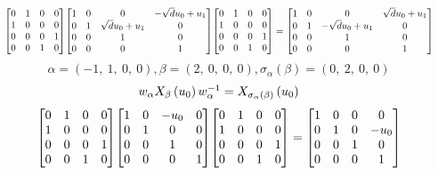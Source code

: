 \documentclass[11pt]{article}
\theoremstyle{definition}
\begin{document}
\[
\scaletoalign{\textwidth}{{\left[\begin{matrix}0 & 1 & 0 & 0\\1 & 0 & 0 & 0\\0 & 0 & 0 & 1\\0 & 0 & 1 & 0\end{matrix}\right]} {\left[\begin{matrix}1 & 0 & 0 & - \sqrt{d} u_{0} + u_{1}\\0 & 1 & \sqrt{d} u_{0} + u_{1} & 0\\0 & 0 & 1 & 0\\0 & 0 & 0 & 1\end{matrix}\right]} {\left[\begin{matrix}0 & 1 & 0 & 0\\1 & 0 & 0 & 0\\0 & 0 & 0 & 1\\0 & 0 & 1 & 0\end{matrix}\right]} = {\left[\begin{matrix}1 & 0 & 0 & \sqrt{d} u_{0} + u_{1}\\0 & 1 & - \sqrt{d} u_{0} + u_{1} & 0\\0 & 0 & 1 & 0\\0 & 0 & 0 & 1\end{matrix}\right]}}
\]
\[
\alpha = \left( -1, \  1, \  0, \  0\right), \beta = \left( 2, \  0, \  0, \  0\right), \sigma_{\alpha}(\beta) = \left( 0, \  2, \  0, \  0\right)
\]
\[
\scaletoalign{\textwidth}{w_{\alpha} X_{\beta}\left(u_{0}\right) w_{\alpha}^{-1} = X_{\sigma_{\alpha}\left(\beta\right)}\left(u_{0}\right)}
\]
\[
\scaletoalign{\textwidth}{{\left[\begin{matrix}0 & 1 & 0 & 0\\1 & 0 & 0 & 0\\0 & 0 & 0 & 1\\0 & 0 & 1 & 0\end{matrix}\right]} {\left[\begin{matrix}1 & 0 & - u_{0} & 0\\0 & 1 & 0 & 0\\0 & 0 & 1 & 0\\0 & 0 & 0 & 1\end{matrix}\right]} {\left[\begin{matrix}0 & 1 & 0 & 0\\1 & 0 & 0 & 0\\0 & 0 & 0 & 1\\0 & 0 & 1 & 0\end{matrix}\right]} = {\left[\begin{matrix}1 & 0 & 0 & 0\\0 & 1 & 0 & - u_{0}\\0 & 0 & 1 & 0\\0 & 0 & 0 & 1\end{matrix}\right]}}
\]
\end{document}

